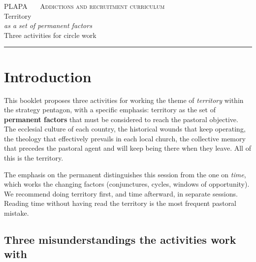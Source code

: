 \documentclass[11pt, a4paper]{article}
\begin{document}

\thispagestyle{plain}
\begin{center}
  \vspace*{1.5em}
  {\color{tenue}\scshape\small PLAPA \ \textbullet\ \ Addictions and recruitment curriculum}\\
  \vspace{2em}
  {\color{territorioTierra}\Huge Territory}\\[0.35em]
  {\color{tinte}\LARGE\itshape as a set of permanent factors}\\
  \vspace{1.4em}
  {\color{tenue}\large Three activities for circle work}\\
  \vspace{0.6em}
  {\color{regla}\rule{0.35\linewidth}{0.5pt}}
\end{center}

\vspace{2em}

\section*{Introduction}

This booklet proposes three activities for working the theme of \emph{territory} within the strategy pentagon, with a specific emphasis: territory as the set of \textbf{permanent factors} that must be considered to reach the pastoral objective. The ecclesial culture of each country, the historical wounds that keep operating, the theology that effectively prevails in each local church, the collective memory that precedes the pastoral agent and will keep being there when they leave. All of this is the territory.

The emphasis on the permanent distinguishes this session from the one on \emph{time}, which works the changing factors (conjunctures, cycles, windows of opportunity). We recommend doing territory first, and time afterward, in separate sessions. Reading time without having read the territory is the most frequent pastoral mistake.

\subsection*{Three misunderstandings the activities work with}
\end{document}
